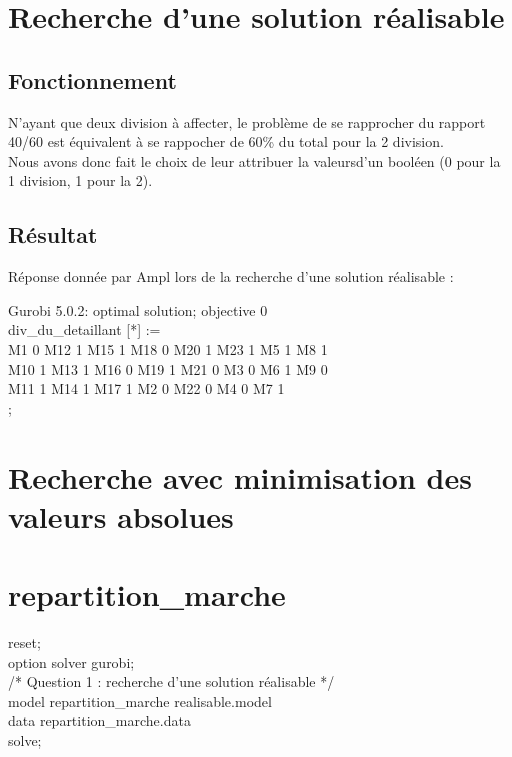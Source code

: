 \documentclass[a4paper,12pt,oneside]{report}
\begin{document}
\chapter{Recherche d'une solution réalisable}

\section{Fonctionnement}

N'ayant que deux division à affecter, le problème de se rapprocher du rapport 40/60 est équivalent à se rappocher de 60\% du total pour la 2\ieme{} division.\\
Nous avons donc fait le choix de leur attribuer la valeursd'un booléen (0 pour la 1\iere{} division, 1 pour la 2\ieme{}).


\section{Résultat}
Réponse donnée par Ampl lors de la recherche d'une solution réalisable :
\newline

Gurobi 5.0.2: optimal solution; objective 0\\
div\_du\_detaillant [*] :=\\
 M1 0   M12 1   M15 1   M18 0   M20 1   M23 1    M5 1    M8 1\\
M10 1   M13 1   M16 0   M19 1   M21 0    M3 0    M6 1    M9 0\\
M11 1   M14 1   M17 1    M2 0   M22 0    M4 0    M7 1\\
;\\

\chapter{Recherche avec minimisation des valeurs absolues}

\appendix
\chapter{repartition\_marche}

reset;\\

option solver gurobi;\\

/* Question 1 : recherche d'une solution réalisable */\\
model repartition\_marche realisable.model\\
data repartition\_marche.data\\
solve;\\
\end{document}
